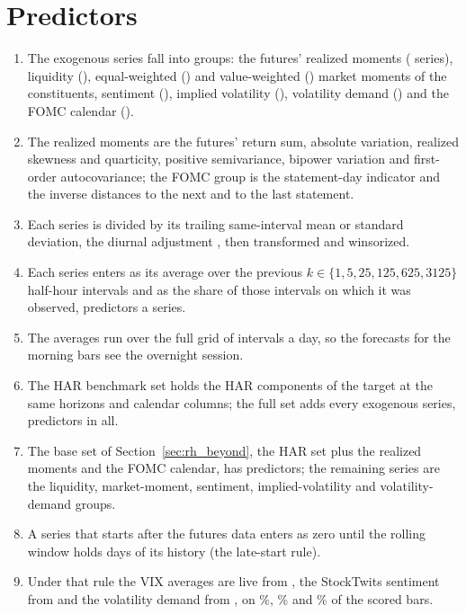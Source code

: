 \section{Predictors}
\label{sec:rh_predictors}

\begin{enumerate}
\item The \rhdmNSeriesPooled{} exogenous series fall into \bkNBuckets{} groups: the futures' realized moments
  (\bkSizeMom{} series), liquidity (\bkSizeLiq), equal-weighted (\bkSizeMew) and value-weighted (\bkSizeMvw) market
  moments of the constituents, sentiment (\bkSizeSent), implied volatility (\bkSizeIv), volatility demand (\bkSizeVd)
  and the FOMC calendar (\bkSizeFomc).
\item The realized moments are the futures' return sum, absolute variation, realized skewness and quarticity, positive
  semivariance, bipower variation and first-order autocovariance; the FOMC group is the statement-day indicator and the
  inverse distances to the next and to the last statement.
\item Each series is divided by its trailing same-interval mean or standard deviation, the diurnal adjustment
  \citep{AndersenBollerslev1997,AndersenSuTodorovZhang2024}, then transformed and winsorized.
\item Each series enters as its average over the previous $k \in \{1, 5, 25, 125, 625, 3125\}$ half-hour intervals and
  as the share of those intervals on which it was observed, \rhfipNPerSeries{} predictors a series.
\item The averages run over the full grid of \rhdmNIntervals{} intervals a day, so the forecasts for the morning bars
  see the overnight session.
\item The HAR benchmark set holds the HAR components of the target at the same \rhdmNHorizonsPooled{} horizons and
  \rhorNCalendarAf{} calendar columns; the full set adds every exogenous series, \rhorNColsAf{} predictors in all.
\item The base set of Section~\ref{sec:rh_beyond}, the HAR set plus the realized moments and the FOMC calendar, has
  \rhbyFLNBase{} predictors; the remaining \rhbyFLNSeries{} series are the liquidity, market-moment, sentiment,
  implied-volatility and volatility-demand groups.
\item A series that starts after the futures data enters as zero until the rolling window holds \rhorWindowDays{} days
  of its history (the late-start rule).
\item Under that rule the VIX averages are live from \rhlvVixLiveYear, the StockTwits sentiment from
  \rhlvStSentLiveYear{} and the volatility demand from \rhlvVdLiveYear, on \rhlvVixEvRange\%, \rhlvStSentEvRange\% and
  \rhlvVdEvRange\% of the scored bars.
\end{enumerate}

